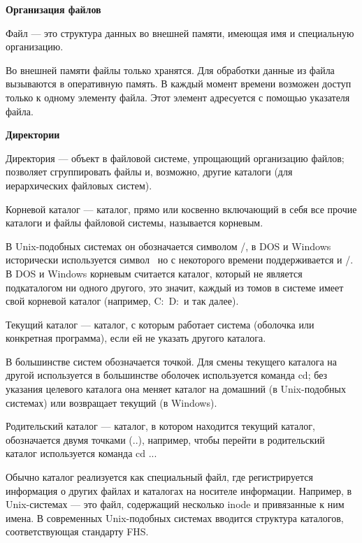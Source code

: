 \begin{center}{\bfseries Организация файлов}
\end{center}

\begin{opr} 
  Файл — это структура данных во внешней памяти, имеющая имя и специальную организацию.
\end{opr}

Во внешней памяти файлы только хранятся. Для обработки данные из файла вызываются в оперативную память. В каждый момент времени возможен доступ только к одному элементу файла. Этот элемент адресуется с помощью указателя файла.

\begin{center}{\bfseries Директории}
\end{center}

\begin{opr} 
  Директория — объект в файловой системе, упрощающий организацию файлов; позволяет сгруппировать файлы и, возможно, другие каталоги (для иерархических файловых систем).
\end{opr}

\begin{opr}
  Корневой каталог — каталог, прямо или косвенно включающий в себя все прочие каталоги и файлы файловой системы, называется корневым. 
\end{opr}
В Unix-подобных системах он обозначается символом /, в DOS и Windows исторически используется символ \, но с некоторого времени поддерживается и /. В DOS и Windows корневым считается каталог, который не является подкаталогом ни одного другого, это значит, каждый из томов в системе имеет свой корневой каталог (например, C:\, D:\ и так далее).

\begin{opr} 
  Текущий каталог — каталог, с которым работает система (оболочка или конкретная программа), если ей не указать другого каталога.
\end{opr}
В большинстве систем обозначается точкой. Для смены текущего каталога на другой используется в большинстве оболочек используется команда cd; без указания целевого каталога она меняет каталог на домашний (в Unix-подобных системах) или возвращает текущий (в Windows).

\begin{opr} 
  Родительский каталог — каталог, в котором находится текущий каталог, обозначается двумя точками (..), например, чтобы перейти в родительский каталог используется команда cd ...
\end{opr}
Обычно каталог реализуется как специальный файл, где регистрируется информация о других файлах и каталогах на носителе информации. Например, в Unix-системах — это файл, содержащий несколько inode и привязанные к ним имена. В современных Unix-подобных системах вводится структура каталогов, соответствующая стандарту FHS.

